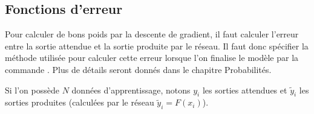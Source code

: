 \documentclass[11pt,class=report,crop=false]{standalone}
\begin{document}
\begin{minipage}{0.45\textwidth}
\end{minipage}
\begin{minipage}{0.45\textwidth}
\end{minipage}

\subsection{Fonctions d'erreur}


Pour calculer de bons poids par la descente de gradient, il faut calculer l'erreur entre la sortie attendue et la sortie produite par le réseau. Il faut donc spécifier la méthode utilisée pour calculer cette erreur lorsque l'on finalise le modèle par la commande .
Plus de détails seront donnés dans le chapitre \og{}Probabilités\fg{}.

Si l'on possède $N$ données d'apprentissage, notons $y_i$ les sorties attendues et $\widetilde y_i$ les sorties produites (calculées par le réseau $\widetilde y_i = F(x_i)$).
\end{document}
